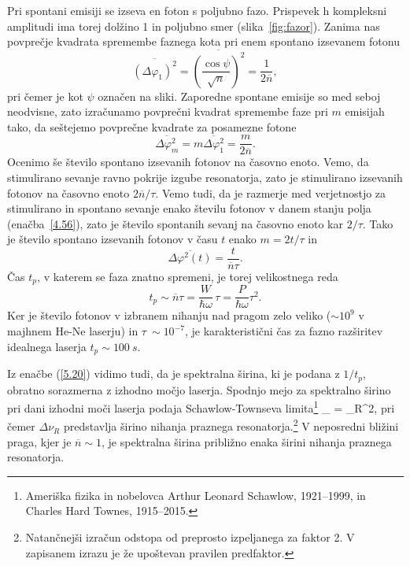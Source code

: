 Pri spontani emisiji se izseva en foton s poljubno fazo. Prispevek h kompleksni
amplitudi ima torej dolžino 1 in poljubno smer (slika~\ref{fig:fazor}). Zanima
nas povprečje kvadrata spremembe faznega kota pri enem spontano izsevanem fotonu
\begin{equation}
\overline{(\Delta \varphi_{1})^{2}}=\overline{\left(\frac{\cos\psi}{\sqrt{n} }\right)^2}
=\frac{1}{2\overline{n}},
\label{5.17}
\end{equation}
pri čemer je kot $\psi$ označen na sliki. 
Zaporedne spontane emisije so med seboj neodvisne, zato izračunamo
povprečni kvadrat spremembe faze pri $m$ emisijah tako, da seštejemo
povprečne kvadrate za posamezne fotone 
\begin{equation}
\overline{\Delta \varphi_{m}^{2}}=m\overline{\Delta \varphi_{1}^{2}}=
\frac{m}{2\overline{n}}.
\label{5.18}
\end{equation}
Ocenimo še število spontano izsevanih fotonov na časovno enoto.
Vemo, da stimulirano sevanje ravno pokrije izgube resonatorja, zato je
stimulirano izsevanih fotonov na časovno enoto $2\overline{n}/\tau $. Vemo tudi, 
da je razmerje med verjetnostjo za stimulirano in spontano sevanje enako 
številu fotonov v danem stanju polja (enačba~\ref{4.56}), zato je število 
spontanih sevanj na časovno enoto kar $2/\tau $.
Tako je število spontano izsevanih fotonov v času $t$ enako $m=2t/\tau $ in 
\begin{equation}
\overline{\Delta \varphi^{2}(t)}=\frac{t}{\overline{n}\tau }.
\label{5.19}
\end{equation}
Čas $t_{p}$, v katerem se faza znatno spremeni, je torej
velikostnega reda 
\begin{equation}
t_{p}\sim \overline{n}\tau =\frac{W}{\hbar \omega }\,\tau =\frac{P}{\hbar
\omega }\tau ^{2}.
\label{5.20}
\end{equation}
Ker je število fotonov v izbranem nihanju nad pragom zelo veliko ($\sim 10^9$ v majhnem 
He-Ne laserju) in $\tau~\sim 10^{-7}$, je karakteristični
čas za fazno razširitev idealnega laserja $t_p \sim 100~\si{s}$. 

Iz enačbe (\ref{5.20}) vidimo tudi, da je spektralna širina, ki je
podana z $1/t_{p}$, obratno sorazmerna z izhodno močjo laserja. Spodnjo
mejo za spektralno širino pri dani izhodni moči laserja 
podaja Schawlow-Townseva limita\footnote{Ameriška fizika in nobelovca 
Arthur Leonard Schawlow, 1921--1999, in Charles Hard Townes, 1915--2015.}
\beq
\Delta \nu_ =  \Delta \nu_R^2,
\eeq
pri čemer $\Delta \nu_R$ predstavlja širino nihanja praznega 
resonatorja.\footnote{Natančnejši izračun odstopa od preprosto izpeljanega za faktor 2. V 
zapisanem izrazu je že upoštevan pravilen predfaktor.}
V neposredni bližini praga, kjer je $\overline{n}\sim 1$, je 
spektralna širina približno enaka širini nihanja praznega resonatorja.

